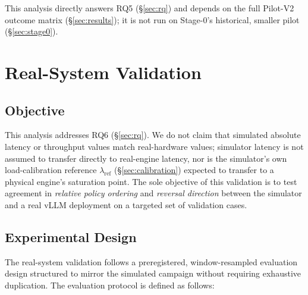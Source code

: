 \documentclass[sn-basic,Numbered,pdflatex]{sn-jnl}
\begin{document}
This analysis directly answers RQ5 (\S\ref{sec:rq}) and depends on the full
Pilot-V2 outcome matrix (\S\ref{sec:results}); it is not run on Stage-0's
historical, smaller pilot (\S\ref{sec:stage0}).

\section{Real-System Validation}
\label{sec:real-system}

\subsection{Objective}
\label{sec:real-system-objective}

This analysis addresses RQ6 (\S\ref{sec:rq}). We do not claim that simulated absolute latency or throughput values match real-hardware values; simulator latency is not assumed to transfer directly to real-engine latency, nor is the simulator's own load-calibration reference $\lambda_{\mathrm{ref}}$ (\S\ref{sec:calibration}) expected to transfer to a physical engine's saturation point. The sole objective of this validation is to test agreement in \emph{relative policy ordering} and \emph{reversal direction} between the simulator and a real vLLM deployment on a targeted set of validation cases.

\subsection{Experimental Design}
\label{sec:real-system-design}

The real-system validation follows a preregistered, window-resampled evaluation design structured to mirror the simulated campaign without requiring exhaustive duplication. The evaluation protocol is defined as follows:
\end{document}
